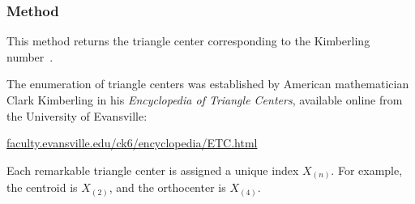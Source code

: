 \begin{tkzexample}[latex=.5\textwidth]
\begin{center}
\end{center}
\end{tkzexample}

\subsubsection{Method }
\label{ssub:method_triangle_kimberling_n}

This method returns the triangle center corresponding to the Kimberling number~.

\medskip

The enumeration of triangle centers was established by American mathematician Clark Kimberling in his \textit{Encyclopedia of Triangle Centers}, available online from the University of Evansville:
\begin{center}
\href{http://faculty.evansville.edu/ck6/encyclopedia/ETC.html}{faculty.evansville.edu/ck6/encyclopedia/ETC.html}
\end{center}


Each remarkable triangle center is assigned a unique index $X_{(n)}$. For example, the centroid is $X_{(2)}$, and the orthocenter is $X_{(4)}$.

\medskip

